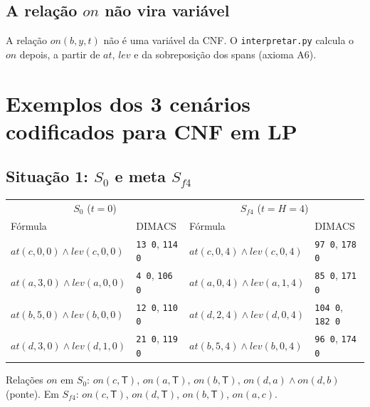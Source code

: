 \documentclass[11pt,a4paper]{article}
\newcommand{\at}{\mathit{at}}
\newcommand{\lev}{\mathit{lev}}
\newcommand{\on}{\mathit{on}}
\newcommand{\mesaT}{\mathsf{T}}
\begin{document}
\subsection{A relação \texorpdfstring{$\on$}{on} não vira variável}
A relação $\on(b,y,t)$ não é uma variável da CNF. O \texttt{interpretar.py}
calcula o $\on$ depois, a partir de $\at$, $\lev$ e da sobreposição dos spans
(axioma A6).

\section{Exemplos dos 3 cenários codificados para CNF em LP}
\subsection{Situação 1: \texorpdfstring{$S_0$}{S0} e meta \texorpdfstring{$S_{f4}$}{Sf4}}
\begin{center}\small
\begin{tabular}{@{}ll|ll@{}}
\toprule
\multicolumn{2}{c|}{$S_0$ ($t=0$)} & \multicolumn{2}{c}{$S_{f4}$ ($t=H=4$)}\\
Fórmula & DIMACS & Fórmula & DIMACS\\
\midrule
$\at(c,0,0)\land\lev(c,0,0)$ & \texttt{13 0}, \texttt{114 0} & $\at(c,0,4)\land\lev(c,0,4)$ & \texttt{97 0}, \texttt{178 0}\\
$\at(a,3,0)\land\lev(a,0,0)$ & \texttt{4 0}, \texttt{106 0} & $\at(a,0,4)\land\lev(a,1,4)$ & \texttt{85 0}, \texttt{171 0}\\
$\at(b,5,0)\land\lev(b,0,0)$ & \texttt{12 0}, \texttt{110 0} & $\at(d,2,4)\land\lev(d,0,4)$ & \texttt{104 0}, \texttt{182 0}\\
$\at(d,3,0)\land\lev(d,1,0)$ & \texttt{21 0}, \texttt{119 0} & $\at(b,5,4)\land\lev(b,0,4)$ & \texttt{96 0}, \texttt{174 0}\\
\bottomrule
\end{tabular}
\end{center}
Relações $\on$ em $S_0$: $\on(c,\mesaT)$, $\on(a,\mesaT)$, $\on(b,\mesaT)$,
$\on(d,a)\land\on(d,b)$ (ponte). Em $S_{f4}$: $\on(c,\mesaT)$, $\on(d,\mesaT)$,
$\on(b,\mesaT)$, $\on(a,c)$.
\end{document}
